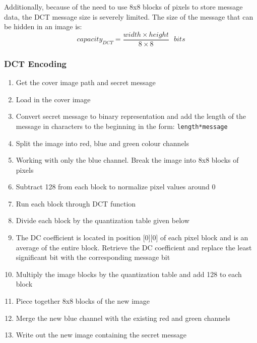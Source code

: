 \documentclass[11pt,letterpaper]{article}
\begin{document}
Additionally, because of the need to use 8x8 blocks of pixels to store message data, the DCT message size is severely limited. The size of the message that can be hidden in an image is:
$$capacity_{DCT} = \frac{width \times height}{8 \times 8} \ \ \ bits$$

\subsubsection{DCT Encoding}
\begin{enumerate}
\setlength\itemsep{0pt}
\item Get the cover image path and secret message
\item Load in the cover image
\item Convert secret message to binary representation and add the length of the message in characters to the beginning in the form: \texttt{length*message}
\item Split the image into red, blue and green colour channels
\item Working with only the blue channel. Break the image into 8x8 blocks of pixels
\item Subtract 128 from each block to normalize pixel values around 0
\item Run each block through DCT function
\item Divide each block by the quantization table given below
\item The DC coefficient is located in position [0][0] of each pixel block and is an average of the entire block. Retrieve the DC coefficient and replace the least significant bit with the corresponding message bit
\item Multiply the image blocks by the quantization table and add 128 to each block
\item Piece together 8x8 blocks of the new image
\item Merge the new blue channel with the existing red and green channels
\item Write out the new image containing the secret message
\end{enumerate}
\end{document}

